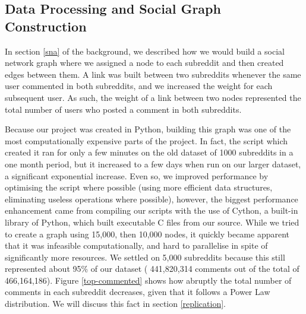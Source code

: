 \documentclass[bsc,frontabs,twoside,singlespacing,parskip,deptreport]{infthesis}
\begin{document}
\begin{table}[!h]
\centering
{}
\caption{Statistics generated from the data}
\label{tab:statistics}
\end{table}

\subsection{Data Processing and Social Graph Construction}\label{processing}
In section \ref{sna} of the background, we described how we would build a social network graph where we assigned a node to each subreddit and then created edges between them. A link was built between two subreddits whenever the same user commented in both subreddits, and we increased the weight for each subsequent user. As such, the weight of a link between two nodes represented the total number of users who posted a comment in both subreddits.

Because our project was created in Python, building this graph was one of the most computationally expensive parts of the project. In fact, the script which created it ran for only a few minutes on the old dataset of 1000 subreddits in a one month period, but it increased to a few days when run on our larger dataset, a significant exponential increase. Even so, we improved performance by optimising the script where possible (using more efficient data structures, eliminating useless operations where possible), however, the biggest performance enhancement came from compiling our scripts with the use of Cython, a built-in library of Python, which built executable C files from our source. While we tried to create a graph using 15,000, then 10,000 nodes, it quickly became apparent that it was infeasible computationally, and hard to parallelise in spite of significantly more resources. We settled on 5,000 subreddits because this still represented about 95\% of our dataset ( 	441,820,314 comments out of the total of 466,164,186). Figure \ref{top-commented} shows how abruptly the total number of comments in each subreddit decreases, given that it follows a Power Law distribution. We will discuss this fact in section \ref{replication}.
\end{document}
